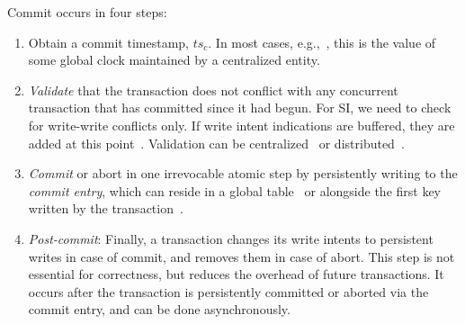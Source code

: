   Commit occurs in four steps:
  \begin{enumerate}
    \setlength{\itemsep}{0pt}
    \setlength{\parskip}{0pt}
    \setlength{\parsep}{2pt}  
  \item
  Obtain a commit timestamp, $ts_c$. 
  In most cases, e.g.,~\cite{Percolator2010,OmidICDE2014,Omid2017,tephra}, 
  this is the value of some global clock maintained by a centralized entity. 
  \item \emph{Validate} that the transaction does not conflict with any concurrent transaction that has committed since it 
had begun.  For SI, we need to check for write-write conflicts only. 
If write intent indications are buffered, they are added at this point~\cite{Percolator2010}.
Validation can be centralized~\cite{OmidICDE2014,Omid2017,tephra} or distributed~\cite{Percolator2010,cockroach}. 


\item \emph{Commit} or abort in one  irrevocable atomic step by persistently writing to the \emph{commit entry}, 
  which can reside in a global table~\cite{Omid2017,cockroach} or alongside the first  key written by 
  the transaction~\cite{Percolator2010}.  
  
 \item \emph{Post-commit}: 
  Finally, a transaction changes its write intents to
  persistent writes in case of commit, and removes them in case of abort. This
  step is not essential for correctness, but reduces the overhead of future transactions. It
  occurs after the transaction is persistently committed or aborted via the commit entry, 
  and can be done asynchronously.
 \end{enumerate}
 




